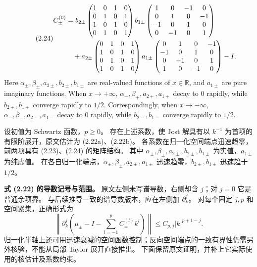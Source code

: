 \begin{paperpropositionen}
\begin{equation}
\originaleq{2.24}
\begin{aligned}
C_\pm^{(0)}
&=b_{2\pm}\begin{pmatrix}1&0&1&0\\0&1&0&1\\1&0&1&0\\0&1&0&1\end{pmatrix}
b_{1\pm}\begin{pmatrix}1&0&-1&0\\0&1&0&-1\\-1&0&1&0\\0&-1&0&1\end{pmatrix}\\
&\quad+a_{2\pm}\begin{pmatrix}0&1&0&1\\1&0&1&0\\0&1&0&1\\1&0&1&0\end{pmatrix}
a_{1\pm}\begin{pmatrix}0&1&0&-1\\-1&0&1&0\\0&-1&0&1\\1&0&-1&0\end{pmatrix}-I.
\end{aligned}
\end{equation}
Here $\alpha_\pm,\beta_\pm,a_{2\pm},b_{2\pm},b_{1\pm}$ are real-valued functions of $x\in\mathbb R$, and $a_{1\pm}$ are pure imaginary functions.
When $x\to+\infty$, $\alpha_+,\beta_+,a_{2+},a_{1+}$ decay to 0 rapidly, while $b_{2+},b_{1+}$ converge rapidly to $1/2$.
Correspondingly, when $x\to-\infty$, $\alpha_-,\beta_-,a_{2-},a_{1-}$ decay to 0 rapidly, while $b_{2-},b_{1-}$ converge rapidly to $1/2$.
\end{paperpropositionen}
\begin{paperpropositioncn*}
设初值为 Schwartz 函数，$p\ge0$。
存在上述系数，使 Jost 解具有以 $k^{-1}$ 为首项的有限阶展开，原文估计为 (2.22a)、(2.22b)。
各系数在归一化空间端点迅速趋零，前两项具有 (2.23)、(2.24) 的矩阵结构。
其中 $\alpha_\pm,\beta_\pm,a_{2\pm},b_{2\pm},b_{1\pm}$ 为实值，$a_{1\pm}$ 为纯虚值。
在各自归一化端点，$\alpha_\pm,\beta_\pm,a_{2\pm},a_{1\pm}$ 迅速趋零，$b_{2\pm},b_{1\pm}$ 迅速趋于 $1/2$。
\end{paperpropositioncn*}
\begin{note}
\textbf{式 (2.22) 的导数记号与范围。}
原文左侧未写谱导数，右侧却含 $j$；对 $j=0$ 它是普通余项界。
与后续推导一致的谱导数版本，应在左侧加 $\partial_k^j$。
对每个固定 $j,p$ 和空间紧集，正确形式为
\[
\left\|\partial_k^j\left(\mu_\pm-I-\sum\limits_{l=-1}^p C_\pm^{(l)}k^l\right)\right\|
\le C_{p,j}|k|^{p+1-j}.
\]
归一化半轴上还可用迅速衰减的空间函数控制；反向空间端点的一致有界性仍需另外核验，不能从局部 Taylor 展开直接推出。
下面保留原文证明，并补上它实际使用的核估计及系数约束。
\end{note}

